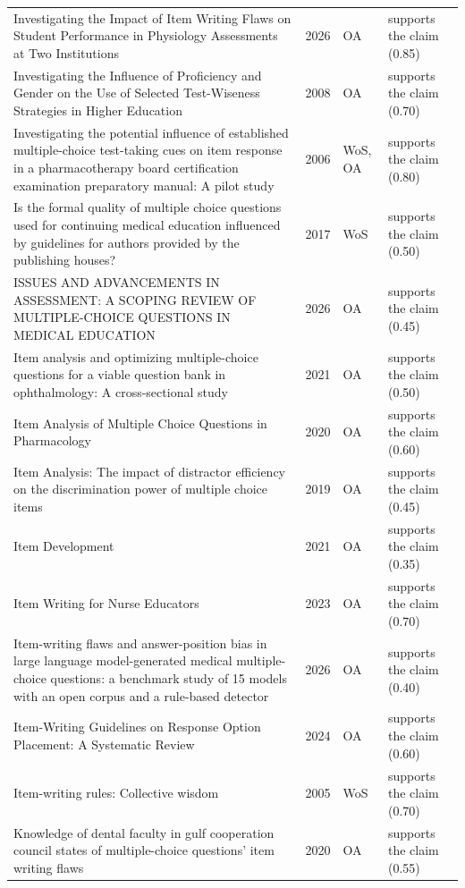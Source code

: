 \begin{longtable}{@{}%
  >{\raggedright\arraybackslash}p{}c%
  >{\raggedright\arraybackslash}p{}%
  >{\raggedright\arraybackslash}p{}@{}}
Investigating the Impact of Item Writing Flaws on Student Performance in Physiology Assessments at Two Institutions & 2026 & OA & supports the claim (0.85) \\
Investigating the Influence of Proficiency and Gender on the Use of Selected Test-Wiseness Strategies in Higher Education & 2008 & OA & supports the claim (0.70) \\
Investigating the potential influence of established multiple-choice test-taking cues on item response in a pharmacotherapy board certification examination preparatory manual: A pilot study & 2006 & WoS, OA & supports the claim (0.80) \\
Is the formal quality of multiple choice questions used for continuing medical education influenced by guidelines for authors provided by the publishing houses? & 2017 & WoS & supports the claim (0.50) \\
ISSUES AND ADVANCEMENTS IN ASSESSMENT: A SCOPING REVIEW OF MULTIPLE-CHOICE QUESTIONS IN MEDICAL EDUCATION & 2026 & OA & supports the claim (0.45) \\
Item analysis and optimizing multiple-choice questions for a viable question bank in ophthalmology: A cross-sectional study & 2021 & OA & supports the claim (0.50) \\
Item Analysis of Multiple Choice Questions in Pharmacology & 2020 & OA & supports the claim (0.60) \\
Item Analysis: The impact of distractor efficiency on the discrimination power of multiple choice items & 2019 & OA & supports the claim (0.45) \\
Item Development & 2021 & OA & supports the claim (0.35) \\
Item Writing for Nurse Educators & 2023 & OA & supports the claim (0.70) \\
Item-writing flaws and answer-position bias in large language model-generated medical multiple-choice questions: a benchmark study of 15 models with an open corpus and a rule-based detector & 2026 & OA & supports the claim (0.40) \\
Item-Writing Guidelines on Response Option Placement: A Systematic Review & 2024 & OA & supports the claim (0.60) \\
Item-writing rules: Collective wisdom & 2005 & WoS & supports the claim (0.70) \\
Knowledge of dental faculty in gulf cooperation council states of multiple-choice questions' item writing flaws & 2020 & OA & supports the claim (0.55) \\

\end{longtable}
